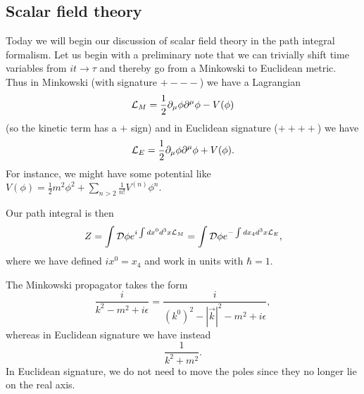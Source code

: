 \subsection*{Scalar field theory} 
Today we will begin our discussion of scalar field theory in the path integral formalism. Let us begin with a preliminary note that we can trivially shift time variables from $i t\to \tau$ and thereby go from a Minkowski to Euclidean metric. Thus in Minkowski (with signature $+---$) we have a Lagrangian
\begin{equation*}
    \mathcal L_M=\frac{1}{2} \partial_\mu \phi \partial^\mu \phi -V(\phi)
\end{equation*}
(so the kinetic term has a $+$ sign) and in Euclidean signature ($++++$) we have
\begin{equation*}
    \mathcal L_E=\frac{1}{2} \partial_\mu \phi \partial^\mu \phi+ V(\phi).
\end{equation*}
For instance, we might have some potential like $V(\phi)=\frac{1}{2} m^2 \phi^2 +\sum_{n>2} \frac{1}{n!} V^{(n)} \phi^n$.

Our path integral is then
\begin{equation}
    Z=\int \mathcal{D} \phi e^{i\int dx^0 d^3x \mathcal L_M}= \int \mathcal{D} \phi e^{-\int dx_4 d^3x \mathcal L_E},
\end{equation}
where we have defined $ix^0=x_4$ and work in units with $\hbar =1$.

The Minkowski propagator takes the form
\begin{equation}
    \frac{i}{k^2-m^2+i\epsilon} = \frac{i}{(k^0)^2 -|\vec k|^2 -m^2 +i\epsilon},
\end{equation}
whereas in Euclidean signature we have instead
\begin{equation}
    \frac{1}{k^2+m^2}.
\end{equation}
In Euclidean signature, we do not need to move the poles since they no longer lie on the real axis.

